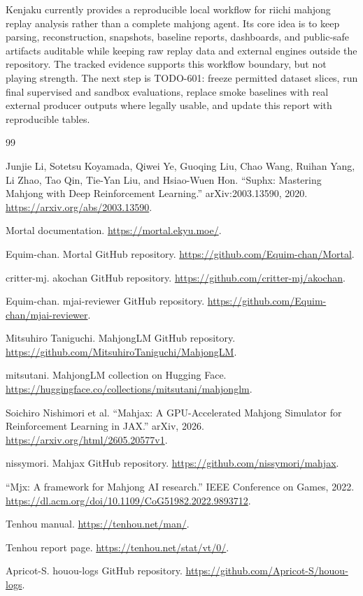 \documentclass[11pt]{article}
\begin{document}
Kenjaku currently provides a reproducible local workflow for riichi mahjong replay analysis rather
than a complete mahjong agent. Its core idea is to keep parsing, reconstruction, snapshots,
baseline reports, dashboards, and public-safe artifacts auditable while keeping raw replay data and
external engines outside the repository. The tracked evidence supports this workflow boundary, but
not playing strength. The next step is TODO-601: freeze permitted dataset slices, run final
supervised and sandbox evaluations, replace smoke baselines with real external producer outputs
where legally usable, and update this report with reproducible tables.

\begin{thebibliography}{99}

Junjie Li, Sotetsu Koyamada, Qiwei Ye, Guoqing Liu, Chao Wang, Ruihan Yang, Li Zhao, Tao Qin,
Tie-Yan Liu, and Hsiao-Wuen Hon. ``Suphx: Mastering Mahjong with Deep Reinforcement Learning.''
arXiv:2003.13590, 2020. \url{https://arxiv.org/abs/2003.13590}.

Mortal documentation. \url{https://mortal.ekyu.moe/}.

Equim-chan. Mortal GitHub repository. \url{https://github.com/Equim-chan/Mortal}.

critter-mj. akochan GitHub repository. \url{https://github.com/critter-mj/akochan}.

Equim-chan. mjai-reviewer GitHub repository. \url{https://github.com/Equim-chan/mjai-reviewer}.

Mitsuhiro Taniguchi. MahjongLM GitHub repository. \url{https://github.com/MitsuhiroTaniguchi/MahjongLM}.

mitsutani. MahjongLM collection on Hugging Face. \url{https://huggingface.co/collections/mitsutani/mahjonglm}.

Soichiro Nishimori et al. ``Mahjax: A GPU-Accelerated Mahjong Simulator for Reinforcement Learning
in JAX.'' arXiv, 2026. \url{https://arxiv.org/html/2605.20577v1}.

nissymori. Mahjax GitHub repository. \url{https://github.com/nissymori/mahjax}.

``Mjx: A framework for Mahjong AI research.'' IEEE Conference on Games, 2022.
\url{https://dl.acm.org/doi/10.1109/CoG51982.2022.9893712}.

Tenhou manual. \url{https://tenhou.net/man/}.

Tenhou report page. \url{https://tenhou.net/stat/vt/0/}.

Apricot-S. houou-logs GitHub repository. \url{https://github.com/Apricot-S/houou-logs}.

\end{thebibliography}
\end{document}

